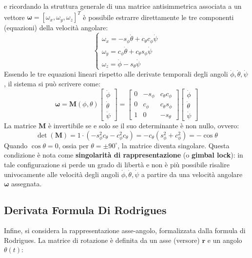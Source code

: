 \documentclass[11pt, a4paper]{report}
\begin{document}
e ricordando la struttura generale di una matrice antisimmetrica associata a un vettore \(\bm{\omega} = [\omega_x, \omega_y, \omega_z]^T\) è possibile estrarre direttamente le tre componenti (equazioni) della velocità angolare:
\[
    \begin{cases}
        \omega_x = -s_{\phi}\dot{\theta} + c_{\theta}c_{\phi}\dot{\psi} \\
        \omega_y = c_{\phi}\dot{\theta} + c_{\theta}s_{\phi}\dot{\psi} \\
        \omega_z = \dot{\phi} - s_{\theta}\dot{\psi}
    \end{cases}
\]
Essendo le tre equazioni lineari rispetto alle derivate temporali degli angoli \(\dot{\phi}, \dot{\theta}, \dot{\psi}\), il sistema si può scrivere come:
\[
    \bm{\omega} = \bm{M}(\phi, \theta)
    \begin{bmatrix}
        \dot{\phi} \\
        \dot{\theta} \\
        \dot{\psi}
    \end{bmatrix}
    =
    \begin{bmatrix}
        0 & -s_{\phi} & c_{\theta}c_{\phi}\\
        0 & c_{\phi} & c_{\theta}s_{\phi}\\
        1 & 0 & -s_{\theta}
    \end{bmatrix}
    \begin{bmatrix}
        \dot{\phi} \\
        \dot{\theta} \\
        \dot{\psi}
    \end{bmatrix}
\]
La matrice \(\bm{M}\) è invertibile se e solo se il suo determinante è non nullo, ovvero:
\[
    \det(\bm{M}) = 1 \cdot (-s_\phi^2 c_\theta - c_\phi^2 c_\theta) = -c_\theta (s_\phi^2 + c_\phi^2) = -\cos\theta
\]
Quando \(\cos\theta = 0\), ossia per \(\theta = \pm 90^\circ\), la matrice diventa singolare. Questa condizione è nota come \textbf{singolarità di rappresentazione} (o \textbf{gimbal lock}): in tale configurazione si perde un grado di libertà e non è più possibile risalire univocamente alle velocità degli angoli \(\dot{\phi}, \dot{\theta}, \dot{\psi}\) a partire da una velocità angolare \(\bm{\omega}\) assegnata.\subsection{Derivata Formula Di Rodrigues}
Infine, si considera la rappresentazione asse-angolo, formalizzata dalla formula di Rodrigues. La matrice di rotazione è definita da un asse (versore) \(\bm{r}\) e un angolo \(\theta(t)\):
\end{document}
